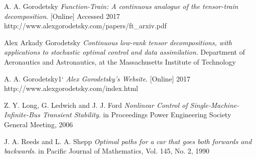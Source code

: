 \documentclass[11pt,draftd]{article}
\begin{document}
\begin{thebibliography}{9}
	A. A. Gorodetsky
	\textit{Function-Train: A continuous analogue of the tensor-train decomposition}.
	[Online] Accessed 2017
	http://www.alexgorodetsky.com/papers/ft\_arxiv.pdf
		
	Alex Arkady Gorodetsky
	\textit{Continuous low-rank tensor decompositions, with applications to stochastic optimal control and data assimilation}.
	Department of Aeronautics and Astronautics, at the Massachusetts Institute of Technology
	
	A. A. Gorodetsky1`
	\textit{Alex Gorodetsky's Website}.
	[Online] 2017
	http://www.alexgorodetsky.com/index.html
	
	Z. Y. Long, G. Ledwich and J. J. Ford
	\textit{Nonlinear Control of Single-Machine-Infinite-Bus Transient Stability}.
	in Proceedings Power Engineering Society General Meeting, 2006
	
	J. A. Reeds and L. A. Shepp
	\textit{Optimal paths for a car that goes both forwards and backwards}.
	in Pacific Journal of Mathematics, Vol. 145, No. 2, 1990
	
\end{thebibliography}
\newpage
\end{document}
